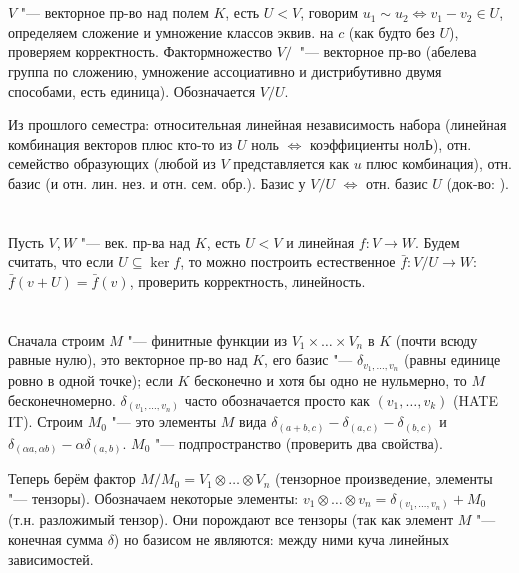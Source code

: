 \section{} %
$V$ "--- векторное пр-во над полем $K$, есть $U < V$, говорим $u_1 \sim u_2 \iff v_1-v_2 \in U$,
определяем сложение и умножение классов эквив. на $c$ (как будто без $U$),
проверяем корректность.
Фактормножество $V/~$ "--- векторное пр-во (абелева группа по сложению, умножение
ассоциативно и дистрибутивно двумя способами, есть единица).
Обозначается $V/U$.

Из прошлого семестра: относительная линейная независимость набора
(линейная комбинация векторов плюс кто-то из $U$ ноль $\iff$ коэффициенты нолЬ),
отн. семейство образующих (любой из $V$ представляется как $u$ плюс комбинация),
отн. базис (и отн. лин. нез. и отн. сем. обр.).
Базис у $V/U$ $\iff$ отн. базис $U$ (док-во: \TODO).

\section{} %
Пусть $V, W$ "--- век. пр-ва над $K$, есть $U < V$ и линейная $f \colon V \to W$.
Будем считать, что если $U \subseteq \ker f$, то можно построить естественное
$\bar f \colon V/U \to W$: $\bar f(v+U) = \bar f(v)$, проверить корректность, линейность.

\section{} %
Сначала строим $M$ "--- финитные функции из $V_1 \times \dots \times V_n$ в $K$
(почти всюду равные нулю), это векторное пр-во над $K$, его базис "---
$\delta_{v_1, \dots, v_n}$ (равны единице ровно в одной точке); если $K$ бесконечно
и хотя бы одно не нульмерно, то $M$ бесконечномерно.
$\delta_{(v_1, \dots, v_n)}$ часто обозначается просто как $(v_1, \dots, v_k)$ (HATE IT).
Строим $M_0$ "--- это элементы $M$ вида $\delta_{(a+b,c)}-\delta_{(a,c)}-\delta_{(b,c)}$ и
$\delta_{(\alpha a, \alpha b)} - \alpha\delta_{(a, b)}$.
$M_0$ "--- подпространство (проверить два свойства).

Теперь берём фактор $M/M_0=V_1\otimes \dots \otimes V_n$ (тензорное произведение, элементы "--- тензоры).
Обозначаем некоторые элементы: $v_1\otimes \dots \otimes v_n = \delta_{(v_1, \dots, v_n)} + M_0$
(т.н. разложимый тензор).
Они порождают все тензоры (так как элемент $M$ "--- конечная сумма $\delta$)
но базисом не являются: между ними куча линейных зависимостей.

